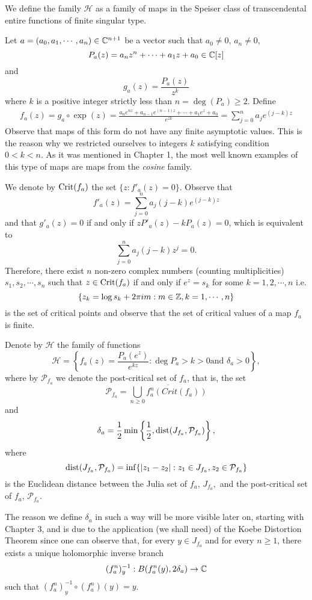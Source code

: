 We define the family $\mathcal{H}$ as a family of maps in the Speiser class
of transcendental entire functions of finite singular type.

Let $a=(a_0, a_1,\cdots, a_n)\in {\mathbb C}^{n+1}$ be a vector such that $a_0\neq
0$, $a_n \neq 0$,
\[
P_a(z)=a_nz^n+\cdots +a_1z+a_0 \in {\mathbb C}[z]
\]
and
\[
g_a(z)=\frac{P_a(z)}{z^k}
\]
where $k$ is a positive integer strictly less than $n=\deg(P_a)\geq 2$.
Define
\[
\begin{array}{l}
  f_a(z)=g_a\circ \exp(z)
  =\frac{a_ne^{nz}+a_{n-1}e^{(n-1)z}+\cdots
    +a_1e^z+a_0}{e^{zk}}=\sum_{j=0}^{n}a_je^{(j-k)z}
\end{array}
\]
Observe that maps of this form do not have any finite asymptotic values.
This is the reason why we restricted ourselves to integers $k$ satisfying
condition $0<k<n$.  As it was mentioned in Chapter 1, the most well known
examples of this type of maps are maps from the {\em cosine} family.

We denote by  $\textrm{Crit}(f_a)$ the set $\{z:f'_a(z)=0\}$. Observe that
\[f'_a(z)=\sum^n_{j=0}a_j(j-k)e^{(j-k)z}\] and that $g'_a(z)=0$ if and only
if $zP'_a(z)-kP_a(z)=0$, which is equivalent to
\[
\sum_{j=0}^na_j(j-k)z^j=0.
\]
Therefore, there exist $n$ non-zero complex numbers (counting
multiplicities) $s_1, s_2,\cdots, s_n$ such that $z\in \textrm{Crit}(f_a)$ if and
only if $e^z =s_k $ for some $k=1, 2, \cdots, n $ i.e.
\[
\{z_k=\log s_{k}+2\pi im:m\in{\mathbb Z}, k=1,\cdots,n\}
\]
is the set of critical points and observe that the set of critical values of
a map $f_a$ is finite.

Denote by $\mathcal{H}$ the family of functions
\[
\mathcal{H}=\left\{f_a(z)=\frac{P_a(e^z)}{e^{kz}}:\deg P_a > k>0 \textrm{
    and } \delta_a> 0\right\},
\]
where by $\mathcal{P}_{f_a}$ we denote the post-critical set of $f_a$, that
is, the set
\[
\mathcal{P}_{f_a}=\overline{\bigcup_{n\geq 0}f^n_a(Crit(f_a))}
\]
and
\[
\delta_a=\frac{1}{2}\min\left\{\frac{1}{2}, {\mathrm{dist}}(J_{f_a},
  \mathcal{P}_{f_a})\right\},
\]
where
\[
{\mathrm{dist}}(J_{f_a}, \mathcal{P}_{f_a})=\inf\{|z_1-z_2|:z_1\in J_{f_a}, z_2\in
\mathcal{P}_{f_a}\}
\]
is the Euclidean distance between the Julia set of $f_a$, $J_{f_a},$ and the
post-critical set of $f_a$, $\mathcal{P}_{f_a}$.

The reason we define $\delta_a$ in such a way will be more visible later on,
starting with Chapter 3, and is due to the application (we shall need) of
the Koebe Distortion Theorem since one can observe that, for every $y \in
J_{f_a}$ and for every $n \geq 1$, there exists a unique holomorphic inverse
branch
\[
(f^n_a)^{-1}_y :B(f^n_a(y), 2\delta_a)\to {\mathbb C}
\]
such that $(f^n_a)^{-1}_y \circ (f^n_a)(y)=y$.

